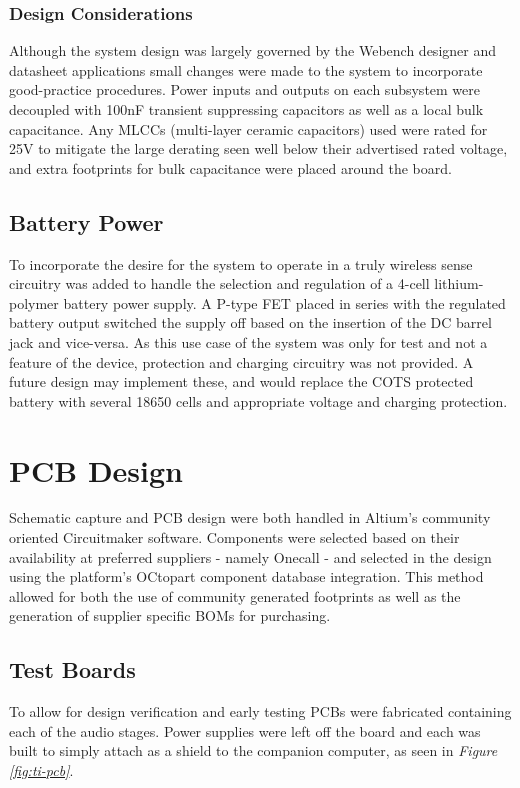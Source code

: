 \documentclass[main.tex]{subfiles}
\begin{document}
\subsubsection{Design Considerations}

Although the system design was largely governed by the Webench designer and datasheet applications small changes were made to the system to incorporate good-practice procedures. Power inputs and outputs on each subsystem were decoupled with 100nF transient suppressing capacitors as well as a local bulk capacitance. Any MLCCs (multi-layer ceramic capacitors) used were rated for 25V to mitigate the large derating seen well below their advertised rated voltage, and extra footprints for bulk capacitance were placed around the board. 

\subsection{Battery Power}

To incorporate the desire for the system to operate in a truly wireless sense circuitry was added to handle the selection and regulation of a 4-cell lithium-polymer battery power supply. A P-type FET placed in series with the regulated battery output switched the supply off based on the insertion of the DC barrel jack and vice-versa. As this use case of the system was only for test and not a feature of the device, protection and charging circuitry was not provided. A future design may implement these, and would replace the COTS protected battery with several 18650 cells and appropriate voltage and charging protection.

\section{PCB Design}

Schematic capture and PCB design were both handled in Altium's community oriented Circuitmaker software. Components were selected based on their availability at preferred suppliers - namely Onecall - and selected in the design using the platform's OCtopart component database integration. This method allowed for both the use of community generated footprints as well as the generation of supplier specific BOMs for purchasing. 

\subsection{Test Boards}
To allow for design verification and early testing PCBs were fabricated containing each of the audio stages. Power supplies were left off the board and each was built to simply attach as a shield to the companion computer, as seen in \textit{Figure \ref{fig:ti-pcb}}.
\end{document}
